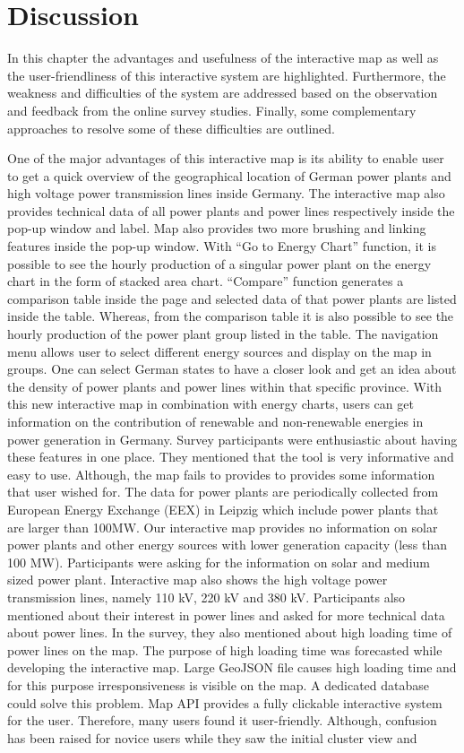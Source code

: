 \chapter{Discussion}
\label{chap:discussion}

In this chapter the advantages and usefulness of the interactive map as well as the user-friendliness of this interactive system are highlighted. Furthermore, the weakness and difficulties of the system are addressed based on the observation and feedback from the online survey studies. Finally, some complementary approaches to resolve some of these difficulties are outlined.

One of the major advantages of this interactive map is its ability to enable user to get a quick overview of the geographical location of German power plants and high voltage power transmission lines inside Germany.  The interactive map also provides technical data of all power plants and power lines respectively inside the pop-up window and label. Map also provides two more brushing and linking features inside the pop-up window. With “Go to Energy Chart” function, it is possible to see the hourly production of a singular power plant on the energy chart in the form of stacked area chart.  “Compare” function generates a comparison table inside the page and selected data of that power plants are listed inside the table. Whereas, from the comparison table it is also possible to see the hourly production of the power plant group listed in the table. The navigation menu allows user to select different energy sources and display on the map in groups. One can select German states to have a closer look and get an idea about the density of power plants and power lines within that specific province. With this new interactive map in combination with energy charts, users can get information on the contribution of renewable and non-renewable energies in power generation in Germany. Survey participants were enthusiastic about having these features in one place. They mentioned that the tool is very informative and easy to use. Although, the map fails to provides to provides some information that user wished for. The data for power plants are periodically collected from European Energy Exchange (EEX) in Leipzig which include power plants that are larger than 100MW. Our interactive map provides no information on solar power plants and other energy sources with lower generation capacity (less than 100 MW). Participants were asking for the information on solar and medium sized power plant. Interactive map also shows the high voltage power transmission lines, namely 110 kV, 220 kV and 380 kV. Participants also mentioned about their interest in power lines and asked for more technical data about power lines. In the survey, they also mentioned about high loading time of power lines on the map. The purpose of high loading time was forecasted while developing the interactive map. Large GeoJSON file causes high loading time and for this purpose irresponsiveness is visible on the map. A dedicated database could solve this problem. Map API provides a fully clickable interactive system for the user. Therefore, many users found it user-friendly. Although, confusion has been raised for novice users while they saw the initial cluster view and 